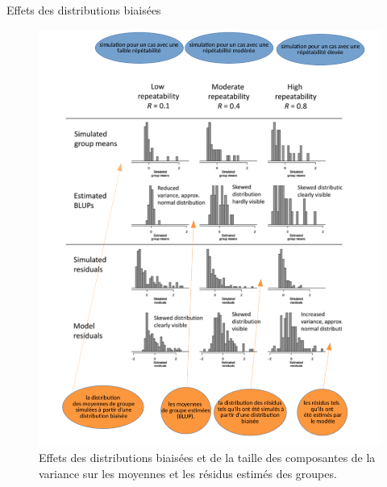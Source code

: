 \documentclass[unknownkeysallowed]{beamer}
\begin{document}
\begin{frame}{Effets des distributions biaisées }

\begin{figure}
\includegraphics[scale=0.28]{2p.png}
\caption{Effets des distributions biaisées et de la taille des composantes de la variance sur les moyennes et les résidus estimés des groupes.}
\end{figure}
\end{frame}
\end{document}
